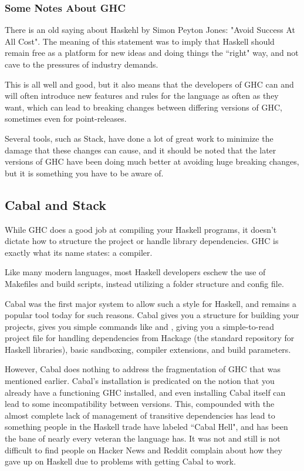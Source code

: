 \subsubsection{Some Notes About GHC} 
There is an old saying about Haskehl by Simon Peyton Jones: "Avoid Success At All Cost".  The meaning of this statement was to imply that Haskell should remain free as a platform for new ideas and doing things the ``right" way, and not cave to the pressures of industry demands. 

This is all well and good, but it also means that the developers of GHC can and will often introduce new features and rules for the language as often as they want, which can lead to breaking changes between differing versions of GHC, sometimes even for point-releases. 

Several tools, such as Stack, have done a lot of great work to minimize the damage that these changes can cause, and it should be noted that the later versions of GHC have been doing much better at avoiding huge breaking changes, but it is something you have to be aware of. 


\subsection{Cabal and Stack}
While GHC does a good job at compiling your Haskell programs, it doesn't dictate how to structure the project or handle library dependencies. GHC is exactly what its name states: a compiler. 

Like many modern languages, most Haskell developers eschew the use of Makefiles and build scripts, instead utilizing a folder structure and config file.  

Cabal was the first major system to allow such a style for Haskell, and remains a popular tool today for such reasons.  Cabal gives you a structure for building your projects, gives you simple commands like  and , giving you a simple-to-read project file for handling dependencies from Hackage (the standard repository for Haskell libraries), basic sandboxing, compiler extensions, and build parameters. 

However, Cabal does nothing to address the fragmentation of GHC that was mentioned earlier.  Cabal's installation is predicated on the notion that you already have a functioning GHC installed, and even installing Cabal itself can lead to some incompatibility between versions. This, compounded with the almost complete lack of management of transitive dependencies has lead to something people in the Haskell trade have labeled ``Cabal Hell", and has been the bane of nearly every veteran the language has. It was not and still is not difficult to find people on Hacker News and Reddit complain about how they gave up on Haskell due to problems with getting Cabal to work. 

